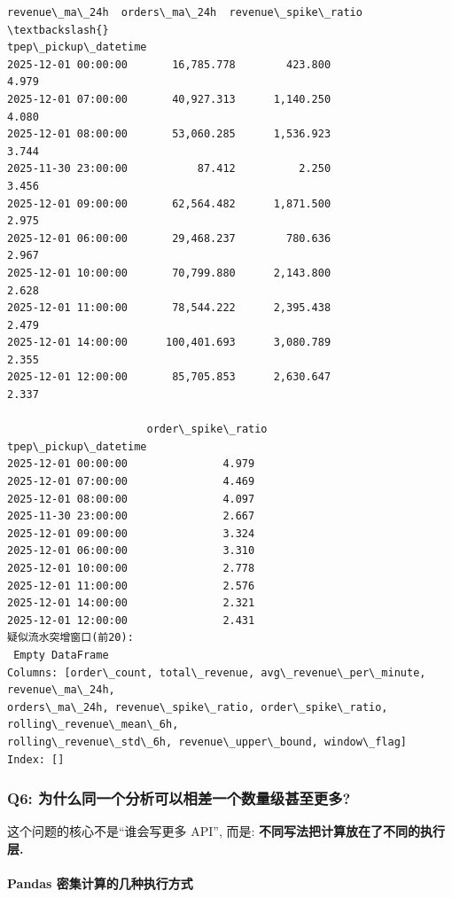 \documentclass[11pt]{article}
\begin{document}
\begin{Verbatim}[commandchars=\\\{\}]
                      revenue\_ma\_24h  orders\_ma\_24h  revenue\_spike\_ratio  \textbackslash{}
tpep\_pickup\_datetime
2025-12-01 00:00:00       16,785.778        423.800                4.979
2025-12-01 07:00:00       40,927.313      1,140.250                4.080
2025-12-01 08:00:00       53,060.285      1,536.923                3.744
2025-11-30 23:00:00           87.412          2.250                3.456
2025-12-01 09:00:00       62,564.482      1,871.500                2.975
2025-12-01 06:00:00       29,468.237        780.636                2.967
2025-12-01 10:00:00       70,799.880      2,143.800                2.628
2025-12-01 11:00:00       78,544.222      2,395.438                2.479
2025-12-01 14:00:00      100,401.693      3,080.789                2.355
2025-12-01 12:00:00       85,705.853      2,630.647                2.337

                      order\_spike\_ratio
tpep\_pickup\_datetime
2025-12-01 00:00:00               4.979
2025-12-01 07:00:00               4.469
2025-12-01 08:00:00               4.097
2025-11-30 23:00:00               2.667
2025-12-01 09:00:00               3.324
2025-12-01 06:00:00               3.310
2025-12-01 10:00:00               2.778
2025-12-01 11:00:00               2.576
2025-12-01 14:00:00               2.321
2025-12-01 12:00:00               2.431
疑似流水突增窗口(前20):
 Empty DataFrame
Columns: [order\_count, total\_revenue, avg\_revenue\_per\_minute, revenue\_ma\_24h,
orders\_ma\_24h, revenue\_spike\_ratio, order\_spike\_ratio, rolling\_revenue\_mean\_6h,
rolling\_revenue\_std\_6h, revenue\_upper\_bound, window\_flag]
Index: []
    \end{Verbatim}

    \subsubsection{Q6:
为什么同一个分析可以相差一个数量级甚至更多?}\label{q6-ux4e3aux4ec0ux4e48ux540cux4e00ux4e2aux5206ux6790ux53efux4ee5ux76f8ux5deeux4e00ux4e2aux6570ux91cfux7ea7ux751aux81f3ux66f4ux591a}

    这个问题的核心不是``谁会写更多 API'', 而是:
\textbf{不同写法把计算放在了不同的执行层.}

    \paragraph{Pandas
密集计算的几种执行方式}\label{pandas-ux5bc6ux96c6ux8ba1ux7b97ux7684ux51e0ux79cdux6267ux884cux65b9ux5f0f}
\end{document}
